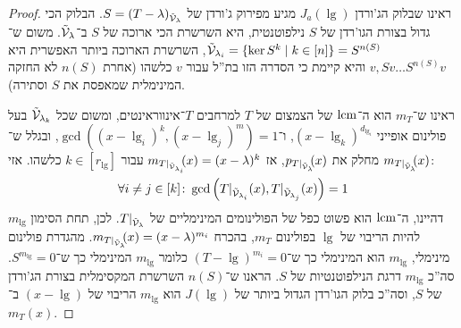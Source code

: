 \documentclass[name=רשימות אלגברה לינארית 2א]{../../../tex/classes/megasumPreamble}
\begin{document}
	 \begin{proof}
		ראינו שבלוק הג'ורדן $J_a(\lg)$ מגיע מפירוק ג'ורדן של $S = (T - \lambda)_{\tilde {\mathcal{V}}_{\lambda}}$. הבלוק הכי גדול בצורת הגו'רדן של $S$ נילפוטנטית, היא השרשרת הכי ארוכה של $S$ ב־$\tilde {\mathcal{V}}_{\lambda}$. משום ש־$\tilde {\mathcal{V}}_{\lambda_i} = \{\ker S^{k} \mid k \in [n]\} = S^{n(S)}$, השרשרת הארוכה ביותר האפשרית היא $v, Sv \dots S^{n(S)}v$ והיא קיימת כי הסדרה הזו בת''ל עבור $v$ כלשהו (אחרת $n(S)$ לא החזקה המינימלית שמאפסת את $S$ וסתירה). 
		
		ראינו ש־$m_T$ הוא ה־$\operatorname{lcm}$ של הצמצום של $T$ למרחבים $T$־אינווראינטים, ומשום שכל $\tilde {\mathcal{V}}_{\lambda_k}$ בעל פולינום אופייני $(x - \lg_k)^{d_{\lg_i}}$, ו־$\gcd((x - \lg_i)^{k}, (x - \lg_j)^{m}) = 1$, ובגלל ש־$m_{\smash{T|_{\tilde {\mathcal{V}}_{\lambda}}}}\!\!(x)$ מחלק את $p_{\smash{T|_{\tilde {\mathcal{V}}_{\lambda}}}}\!\!(x)$, אז $m_{\smash{T|_{\tilde {\mathcal{V}}_{\lambda_i}}}} \!\! (x) = (x - \lambda)^{k}$ עבור $k \in [r_\lg]$ כלשהו. 
		 אזי: 
		\[ \forall i \neq j \in [k] \colon \gcd\left ( T|_{\tilde {\mathcal{V}}_{\lambda_i}}(x), T|_{\tilde {\mathcal{V}}_{\lambda_j}}(x) \right ) = 1 \]
		דהיינו, ה־$\operatorname{lcm}$ הוא פשוט כפל של הפולינומים המינימליים של $T|_{\tilde {\mathcal{V}}_{\lambda}}$. לכן, תחת הסימון $m_\lg$ להיות הריבוי של $\lg$ בפולינום $m_T$, בהכרח $m_{T|_{\tilde {\mathcal{V}}_{\lambda}}}\!\!(x) = (x - \lambda)^{m_i}$. מהגדרת פולינום מינימלי, $m_\lg$ הוא המינימלי כך ש־$(T - \lg)^{m_i} = 0$ כלומר $m_\lg$ המינימלי כך ש־$S^{m_\lg} = 0$. סה''כ $m_\lg$ דרגת הנילפוטנטיות של $S$. הראנו ש־$n(S)$ השרשרת המקסימלית בצורת הג'ורדן של $S$, וסה''כ בלוק הגו'רדן הגדול ביותר של $J(\lg)$ הוא $m_\lg$ הריבוי של $(x - \lg)$ ב־$m_T(x)$. 
	\end{proof}
	
\end{document}
